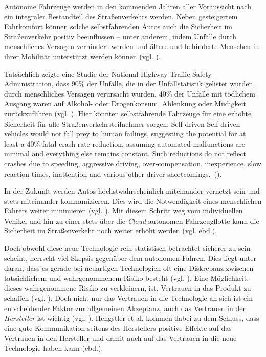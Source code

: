 Autonome Fahrzeuge werden in den kommenden Jahren aller Voraussicht nach ein integraler Bestandteil des Straßenverkehrs werden. Neben gesteigertem Fahrkomfort können solche selbstfahrenden Autos auch die Sicherheit im Straßenverkehr positiv beeinflussen – unter anderem, indem Unfälle durch menschliches Versagen verhindert werden und ältere und behinderte Menschen in ihrer Mobilität unterstützt werden können (vgl.  \cite[167]{fagnant2015preparing}).

Tatsächlich zeigte eine Studie der National Highway Traffic Safety Administration, dass 90\% der Unfälle, die in der Unfallstatistik gelistet wurden, durch menschliches Versagen verursacht wurden. 40\% der Unfälle mit tödlichem Ausgang waren auf Alkohol- oder Drogenkonsum, Ablenkung oder Müdigkeit zurückzuführen (vgl. \cite{singh2015critical}). Hier könnten selbstfahrende Fahrzeuge für eine erhöhte Sicherheit für alle Straßenverkehrsteilnehmer sorgen: \glqq Self-driven Self-driven vehicles would not fall prey to human failings, suggesting the potential for at least a 40\% fatal crash-rate reduction, assuming automated malfunctions are minimal and everything else remains constant. Such reductions do not reflect crashes due to speeding, aggressive driving, over-compensation, inexperience, slow reaction times, inattention and various other driver shortcomings.\grqq \ (\cite[169]{fagnant2015preparing}).

In der Zukunft werden Autos höchstwahrscheinlich miteinander vernetzt sein und stets miteinander kommunizieren. Dies wird die Notwendigkeit eines menschlichen Fahrers weiter minimieren (vgl. \cite[241]{gerla2014internet}). Mit diesem Schritt weg vom individuellen Vehikel und hin zu einer stets über die \emph{Cloud} autonomen Fahrzeugflotte kann die Sicherheit im Straßenverkehr noch weiter erhöht werden (vgl. ebd.).

Doch obwohl diese neue Technologie rein statistisch betrachtet sicherer zu sein scheint, herrscht viel Skepsis gegenüber dem autonomen Fahren. Dies liegt unter daran, dass es gerade bei neuartigen Technologien oft eine Diskrepanz zwischen tatsächlichem und wahrgenommenem Risiko besteht (vgl. \cite[106]{hengstler2016applied}). Eine Möglichkeit, dieses wahrgenommene Risiko zu verkleinern, ist, Vertrauen in das Produkt zu schaffen (vgl. \cite{rousseau1998not}). Doch nicht nur das Vertrauen in die Technologie an sich ist ein entscheidender Faktor zur allgemeinen Akzeptanz, auch das Vertrauen in den \emph{Hersteller} ist wichtig (vgl. \cite[107]{hengstler2016applied}). Hengstler et al. kommen dabei zu dem Schluss, dass eine gute Kommunikation seitens des Herstellers positive Effekte auf das Vertrauen in den Hersteller und damit auch auf das Vertrauen in die neue Technologie haben kann (ebd.).
